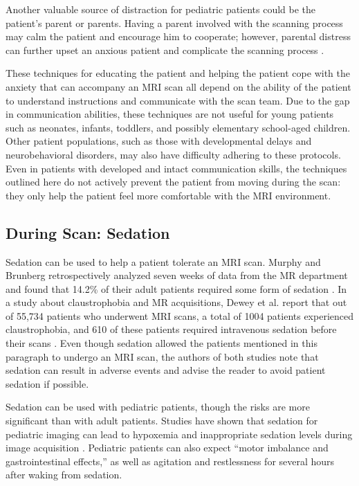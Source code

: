 Another valuable source of distraction for pediatric patients could be the patient's parent or parents. Having a parent involved with the scanning process may calm the patient and encourage him to cooperate; however, parental distress can further upset an anxious patient and complicate the scanning process \cite{Alexander2012}. 

These techniques for educating the patient and helping the patient cope with the anxiety that can accompany an MRI scan all depend on the ability of the patient to understand instructions and communicate with the scan team. Due to the gap in communication abilities, these techniques are not useful for young patients such as neonates, infants, toddlers, and possibly elementary school-aged children. Other patient populations, such as those with developmental delays and neurobehavioral disorders, may also have difficulty adhering to these protocols. Even in patients with developed and intact communication skills, the techniques outlined here do not actively prevent the patient from moving during the scan: they only help the patient feel more comfortable with the MRI environment.

\subsection{During Scan: Sedation}

Sedation can be used to help a patient tolerate an MRI scan. Murphy and Brunberg retrospectively analyzed seven weeks of data from the MR department and found that 14.2\% of their adult patients required some form of sedation \cite{Murphy1997}. In a study about claustrophobia and MR acquisitions, Dewey et al. report that out of 55,734 patients who underwent MRI scans, a total of 1004 patients experienced claustrophobia, and 610 of these patients required intravenous sedation before their scans \cite{Dewey2007}. Even though sedation allowed the patients mentioned in this paragraph to undergo an MRI scan, the authors of both studies note that sedation can result in adverse events and advise the reader to avoid patient sedation if possible.

Sedation can be used with pediatric patients, though the risks are more significant than with adult patients. Studies have shown that sedation for pediatric imaging can lead to hypoxemia and inappropriate sedation levels during image acquisition \cite{Malviya2000}. Pediatric patients can also expect ``motor imbalance and gastrointestinal effects,'' as well as agitation and restlessness for several hours after waking from sedation.

